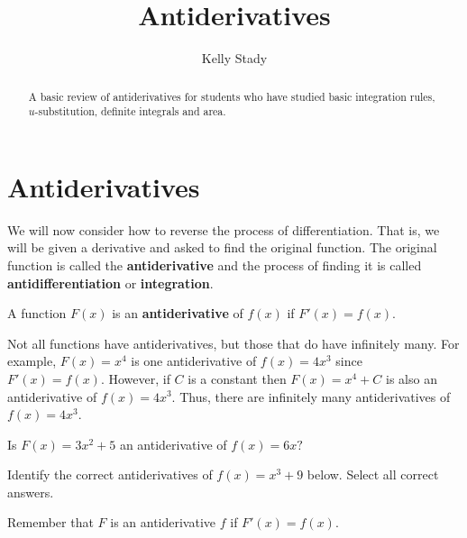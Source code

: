 \documentclass{ximera}
\title{Antiderivatives}   %
\author{Kelly Stady}
\begin{document}
\begin{abstract}
    A basic review of antiderivatives for students who have studied basic integration rules, $u$-substitution, definite integrals and area.
\end{abstract}
\maketitle
\label{xim:AntiderivativesAct}



\section*{Antiderivatives}

We will now consider how to reverse the process of differentiation.  That is, we will be
given a derivative and asked to find the original function. The original function is called
the \textbf{antiderivative} and the process of finding it is called
\textbf{antidifferentiation} or \textbf{integration}.

\begin{theorem}

A function $F(x)$ is an \textbf{antiderivative} of $f(x)$ if $F'(x)=f(x).$
\end{theorem}

\begin{remark}
Not all functions have antiderivatives, but those that do have infinitely many.  For example, $F(x)=x^4$ is
one antiderivative of $f(x)=4x^3$ since $F'(x) = f(x).$  However, if $C$ is a constant then $F(x)= x^4+C$ 
is also an antiderivative of $f(x)=4x^3.$  Thus, there are infinitely many antiderivatives of
$f(x)=4x^3.$

\end{remark}

\begin{problem}
Is $F(x) = 3x^2+5$ an antiderivative of $f(x) = 6x?$

\begin{multipleChoice}
\end{multipleChoice}


\end{problem}


\begin{problem}
Identify the correct antiderivatives of $f(x)=x^3+9$ below.  Select all correct answers.   

\begin{selectAll}
\end{selectAll}

\begin{hint}
Remember that $F$ is an antiderivative $f$ if $F'(x) = f(x).$
\end{hint}                            
\end{problem}
\end{document}
